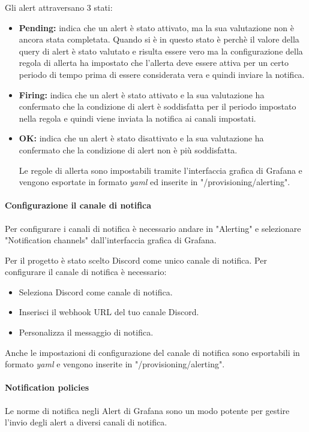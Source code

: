 Gli alert attraversano 3 stati:
\begin{itemize}
    \item \textbf{Pending:} indica che un alert è stato attivato, ma la sua valutazione non è ancora stata completata.
                            Quando si è in questo stato è perchè il valore della query di alert è stato valutato e risulta essere vero ma la configurazione della regola di allerta ha impostato che l'allerta deve essere attiva per un certo periodo di tempo prima di essere considerata vera e quindi inviare la notifica.
\item \textbf{Firing:}  indica che un alert è stato attivato e la sua valutazione ha confermato che la condizione di alert è soddisfatta per il periodo impostato nella regola e quindi viene inviata la notifica ai canali impostati.
\item \textbf{OK:} indica che un alert è stato disattivato e la sua valutazione ha confermato che la condizione di alert non è più soddisfatta.

Le regole di allerta sono impostabili tramite l'interfaccia grafica di Grafana e vengono esportate in formato \textit{yaml} ed inserite in "/provisioning/alerting".
                            
\end{itemize}

\paragraph{Configurazione il canale di notifica}
Per configurare i canali di notifica è necessario andare in "Alerting" e selezionare "Notification channels" dall'interfaccia grafica di Grafana.

Per il progetto è stato scelto Discord come unico canale di notifica.
Per configurare il canale di notifica è necessario:
\begin{itemize}
    \item Seleziona Discord come canale di notifica.
    \item Inserisci il webhook URL del tuo canale Discord.
    \item Personalizza il messaggio di notifica.
\end{itemize}

Anche le impostazioni di configurazione del canale di notifica sono esportabili in formato \textit{yaml} e vengono inserite in "/provisioning/alerting".

\paragraph{Notification policies}
Le norme di notifica negli Alert di Grafana sono un modo potente per gestire l'invio degli alert a diversi canali di notifica.

